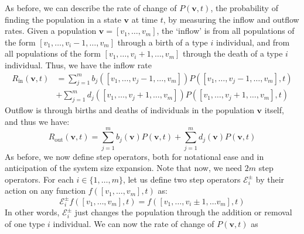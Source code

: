 
As before, we can describe the rate of change of $P(\mathbf{v},t)$, the probability of finding the population in a state $\mathbf{v}$ at time $t$, by measuring the inflow and outflow rates. Given a population $\mathbf{v} = [v_1,\ldots,v_{m}]$, the `inflow' is from all populations of the form $[v_1,\ldots,v_{i}-1,\dots,v_{m}]$ through a birth of a type $i$ individual, and from all populations of the form $[v_1,\ldots,v_{i}+1,\dots,v_{m}]$ through the death of a type $i$ individual. Thus, we have the inflow rate
\begin{equation}
\label{nD_rate_in}
\begin{split}
R_{\textrm{in}}(\mathbf{v},t) &= \sum\limits_{j=1}^{m}b_{j}([v_1,\ldots,v_{j}-1,\ldots,v_m])P([v_1,\ldots,v_{j}-1,\ldots,v_m],t) \\
& +\sum\limits_{j=1}^{m}d_{j}([v_1,\ldots,v_{j}+1,\ldots,v_m])P([v_1,\ldots,v_{j}+1,\ldots,v_m],t)
\end{split}
\end{equation}
Outflow is through births and deaths of individuals in the population $\mathbf{v}$ itself, and thus we have:
\begin{equation}
\label{nD_rate_out}
R_{\textrm{out}}(\mathbf{v},t) = \sum\limits_{j=1}^{m}b_{j}(\mathbf{v})P(\mathbf{v},t) + \sum\limits_{j=1}^{m}d_{j}(\mathbf{v})P(\mathbf{v},t)
\end{equation}
As before, we now define step operators, both for notational ease and in anticipation of the system size expansion. Note that now, we need $2m$ step operators. For each $i \in \{1,\ldots,m\}$, let us define two step operators $\mathcal{E}_{i}^{\pm}$ by their action on any function $f([v_1,\ldots,v_m],t)$ as:
\begin{equation}
\label{nD_step_operators}
\mathcal{E}_{i}^{\pm}f([v_1,\ldots,v_m],t) = f([v_1,\ldots,v_i \pm 1, \ldots v_m],t)
\end{equation}
In other words, $\mathcal{E}_{i}^{\pm}$ just changes the population through the addition or removal of one type $i$ individual. We can now the rate of change of $P(\mathbf{v},t)$ as
